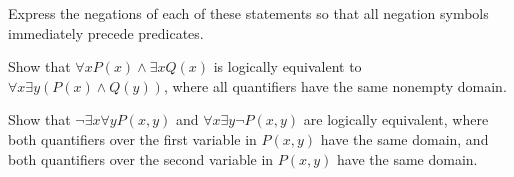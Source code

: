 \documentclass{exam}
\begin{document}
\begin{questions}
\question Express the negations of each of these statements so that
all negation symbols immediately precede predicates.


\question Show that $\forall x P(x) \land \exists x Q(x)$ is logically equivalent to $\forall x \exists y (P(x) \land Q(y))$, where all quantifiers have the same nonempty domain.
\vspace{9in}


\question Show that $\neg \exists x \forall y P(x, y)$ and $\forall x \exists y \neg P(x, y)$ are logically equivalent, where both quantifiers over the first variable in $P(x, y)$ have the same domain, and both quantifiers over the second variable in $P(x, y)$ have the same domain.

\vspace{9in}




\end{questions}
\end{document}
